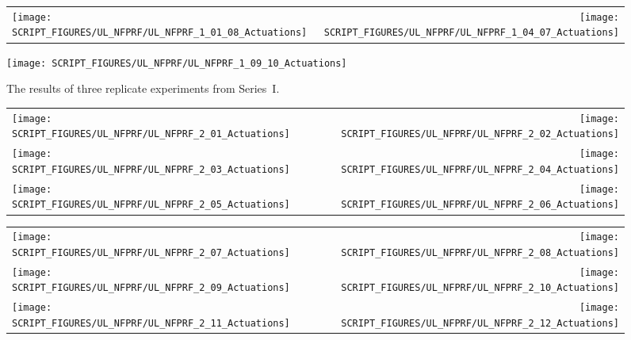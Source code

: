 \begin{figure}[p]
\begin{tabular*}{\textwidth}{l@{\extracolsep{\fill}}r}
\texttt{[image: SCRIPT\_FIGURES/UL\_NFPRF/UL\_NFPRF\_1\_01\_08\_Actuations]} &
\texttt{[image: SCRIPT\_FIGURES/UL\_NFPRF/UL\_NFPRF\_1\_04\_07\_Actuations]}
\end{tabular*}
\begin{center}
\texttt{[image: SCRIPT\_FIGURES/UL\_NFPRF/UL\_NFPRF\_1\_09\_10\_Actuations]}
\end{center}
\caption[The results of three replicate experiments from Series~I]
{The results of three replicate experiments from Series~I.}
\label{UL_NFPRF_Repeatability}
\end{figure}



\begin{figure}[p]
\begin{tabular*}{\textwidth}{l@{\extracolsep{\fill}}r}
\texttt{[image: SCRIPT\_FIGURES/UL\_NFPRF/UL\_NFPRF\_2\_01\_Actuations]} &
\texttt{[image: SCRIPT\_FIGURES/UL\_NFPRF/UL\_NFPRF\_2\_02\_Actuations]} \\
\texttt{[image: SCRIPT\_FIGURES/UL\_NFPRF/UL\_NFPRF\_2\_03\_Actuations]} &
\texttt{[image: SCRIPT\_FIGURES/UL\_NFPRF/UL\_NFPRF\_2\_04\_Actuations]} \\
\texttt{[image: SCRIPT\_FIGURES/UL\_NFPRF/UL\_NFPRF\_2\_05\_Actuations]} &
\texttt{[image: SCRIPT\_FIGURES/UL\_NFPRF/UL\_NFPRF\_2\_06\_Actuations]}
\end{tabular*}
\label{UL_NFPRF_2_1}
\end{figure}

\begin{figure}[p]
\begin{tabular*}{\textwidth}{l@{\extracolsep{\fill}}r}
\texttt{[image: SCRIPT\_FIGURES/UL\_NFPRF/UL\_NFPRF\_2\_07\_Actuations]} &
\texttt{[image: SCRIPT\_FIGURES/UL\_NFPRF/UL\_NFPRF\_2\_08\_Actuations]} \\
\texttt{[image: SCRIPT\_FIGURES/UL\_NFPRF/UL\_NFPRF\_2\_09\_Actuations]} &
\texttt{[image: SCRIPT\_FIGURES/UL\_NFPRF/UL\_NFPRF\_2\_10\_Actuations]} \\
\texttt{[image: SCRIPT\_FIGURES/UL\_NFPRF/UL\_NFPRF\_2\_11\_Actuations]} &
\texttt{[image: SCRIPT\_FIGURES/UL\_NFPRF/UL\_NFPRF\_2\_12\_Actuations]}
\end{tabular*}
\label{UL_NFPRF_2_2}
\end{figure}

